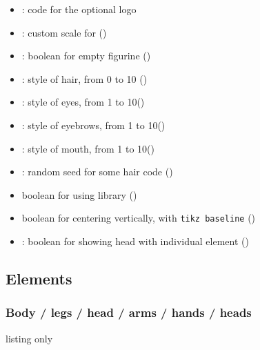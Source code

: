 \documentclass[11pt,a4paper]{ltxdoc}
\begin{document}
\begin{itemize}[leftmargin=*,itemsep=1pt]
	\item {}: code for the optional logo
	\item {}: custom scale for  ()
	\item {}: boolean for empty figurine ()
	\item {}: style of hair, from 0 to 10 ()
	\item {}: style of eyes, from 1 to 10()
	\item {}: style of eyebrows, from 1 to 10()
	\item {}: style of mouth, from 1 to 10()
	\item {}: random seed for some hair code ()
	\item {} boolean for using  library ()
	\item {} boolean for centering vertically, with \texttt{tikz baseline} ()
	\item {}: boolean for showing head with individual element ()
\end{itemize}

\subsection{Elements}

\subsubsection{Body / legs / head / arms / hands / heads}

\begin{DemoCode}{listing only}
\end{DemoCode}
\end{document}
